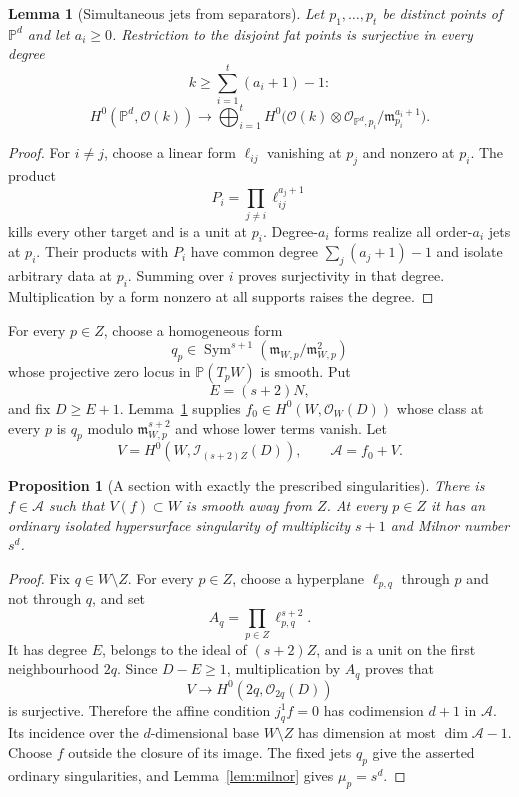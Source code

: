 \documentclass[11pt,a4paper]{article}
\newtheorem{proposition}[theorem]{Proposition}
\newtheorem{lemma}[theorem]{Lemma}
\theoremstyle{definition}
\newcommand{\PP}{\mathbb P}
\newcommand{\cO}{\mathcal O}
\newcommand{\cI}{\mathcal I}
\newcommand{\m}{\mathfrak m}
\begin{document}
\begin{lemma}[Simultaneous jets from separators]\label{lem:jets}
Let $p_1,\ldots,p_t$ be distinct points of $\PP^d$ and let $a_i\geq0$.
Restriction to the disjoint fat points is surjective in every degree
\[
 k\geq\sum_{i=1}^t(a_i+1)-1:
\]
\[
 H^0(\PP^d,\cO(k))\longrightarrow
 \bigoplus_{i=1}^t
 H^0\bigl(\cO(k)\otimes\cO_{\PP^d,p_i}/\m_{p_i}^{a_i+1}\bigr).
\]
\end{lemma}

\begin{proof}
For $i\ne j$, choose a linear form $\ell_{ij}$ vanishing at $p_j$ and
nonzero at $p_i$.  The product
\[
 P_i=\prod_{j\ne i}\ell_{ij}^{a_j+1}
\]
kills every other target and is a unit at $p_i$.  Degree-$a_i$ forms realize
all order-$a_i$ jets at $p_i$.  Their products with $P_i$ have common degree
$\sum_j(a_j+1)-1$ and isolate arbitrary data at $p_i$.  Summing over $i$
proves surjectivity in that degree.  Multiplication by a form nonzero at all
supports raises the degree.
\end{proof}

For every $p\in Z$, choose a homogeneous form
\[
 q_p\in\operatorname{Sym}^{s+1}(\m_{W,p}/\m_{W,p}^2)
\]
whose projective zero locus in $\PP(T_pW)$ is smooth.  Put
\[
 E=(s+2)N,
\]
and fix $D\geq E+1$.  Lemma~\ref{lem:jets} supplies
$f_0\in H^0(W,\cO_W(D))$ whose class at every $p$ is $q_p$ modulo
$\m_{W,p}^{s+2}$ and whose lower terms vanish.  Let
\[
 V=H^0(W,\cI_{(s+2)Z}(D)),\qquad \mathcal A=f_0+V.
\]

\begin{proposition}[A section with exactly the prescribed singularities]
\label{prop:section}
There is $f\in\mathcal A$ such that $V(f)\subset W$ is smooth away from $Z$.
At every $p\in Z$ it has an ordinary isolated hypersurface singularity of
multiplicity $s+1$ and Milnor number $s^d$.
\end{proposition}

\begin{proof}
Fix $q\in W\setminus Z$.  For every $p\in Z$, choose a hyperplane
$\ell_{p,q}$ through $p$ and not through $q$, and set
\[
 A_q=\prod_{p\in Z}\ell_{p,q}^{s+2}.
\]
It has degree $E$, belongs to the ideal of $(s+2)Z$, and is a unit on the
first neighbourhood $2q$.  Since $D-E\geq1$, multiplication by $A_q$ proves
that
\[
 V\longrightarrow H^0(2q,\cO_{2q}(D))
\]
is surjective.  Therefore the affine condition $j_q^1f=0$ has codimension
$d+1$ in $\mathcal A$.  Its incidence over the $d$-dimensional base
$W\setminus Z$ has dimension at most $\dim\mathcal A-1$.  Choose $f$ outside
the closure of its image.  The fixed jets $q_p$ give the asserted ordinary
singularities, and Lemma~\ref{lem:milnor} gives $\mu_p=s^d$.
\end{proof}
\end{document}
